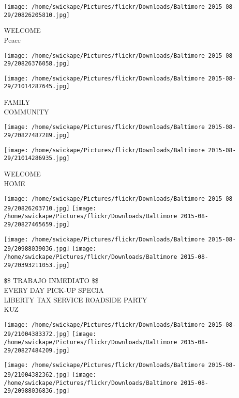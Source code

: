 \documentclass[10pt,letterpaper]{article}
\begin{document}
\vspace{0.25in}
\texttt{[image: /home/swickape/Pictures/flickr/Downloads/Baltimore 2015-08-29/20826205810.jpg]}

WELCOME\\
Peace\\
\pagebreak

\texttt{[image: /home/swickape/Pictures/flickr/Downloads/Baltimore 2015-08-29/20826376058.jpg]}

\vspace{0.25in}
\texttt{[image: /home/swickape/Pictures/flickr/Downloads/Baltimore 2015-08-29/21014287645.jpg]}

FAMILY\\
COMMUNITY\\
\pagebreak

\texttt{[image: /home/swickape/Pictures/flickr/Downloads/Baltimore 2015-08-29/20827487289.jpg]}

\vspace{0.25in}
\texttt{[image: /home/swickape/Pictures/flickr/Downloads/Baltimore 2015-08-29/21014286935.jpg]}

WELCOME\\
HOME\\
\pagebreak

\texttt{[image: /home/swickape/Pictures/flickr/Downloads/Baltimore 2015-08-29/20826203710.jpg]}
\texttt{[image: /home/swickape/Pictures/flickr/Downloads/Baltimore 2015-08-29/20827465659.jpg]}

\texttt{[image: /home/swickape/Pictures/flickr/Downloads/Baltimore 2015-08-29/20988039036.jpg]}
\texttt{[image: /home/swickape/Pictures/flickr/Downloads/Baltimore 2015-08-29/20393211053.jpg]}

\$\$ TRABAJO INMEDIATO \$\$\\
EVERY DAY PICK{-}UP SPECIA\\
LIBERTY TAX SERVICE ROADSIDE PARTY\\
KUZ\\
\pagebreak

\texttt{[image: /home/swickape/Pictures/flickr/Downloads/Baltimore 2015-08-29/21004383372.jpg]}
\texttt{[image: /home/swickape/Pictures/flickr/Downloads/Baltimore 2015-08-29/20827484209.jpg]}

\texttt{[image: /home/swickape/Pictures/flickr/Downloads/Baltimore 2015-08-29/21004382362.jpg]}
\texttt{[image: /home/swickape/Pictures/flickr/Downloads/Baltimore 2015-08-29/20988036836.jpg]}
\end{document}
